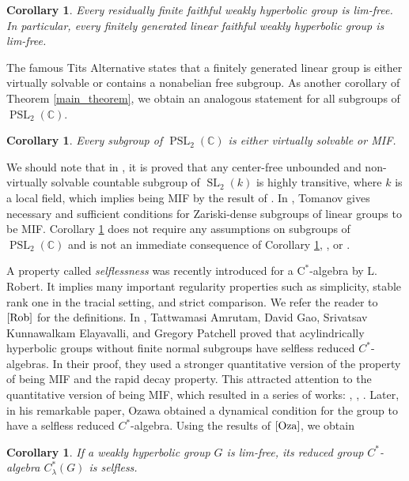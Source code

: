 \documentclass[11pt,letterpaper]{article}
\newcommand{\CC}{\mathbb{C}}
\DeclareMathOperator{\SL}{SL}
\DeclareMathOperator{\PSL}{PSL}
\newtheorem{corA}[thmA]{Corollary}
\theoremstyle{definition}
\theoremstyle{remark}
\begin{document}
\begin{corA}\label{res finite groups}
Every residually finite faithful weakly hyperbolic group is lim-free. In particular, every finitely generated linear faithful weakly hyperbolic group is lim-free.
\end{corA}

The famous Tits Alternative states that a finitely generated linear group is either virtually solvable or contains a nonabelian free subgroup. As another corollary of Theorem \ref{main_theorem}, we obtain an analogous statement for all subgroups of $\PSL_2(\CC)$.

\begin{corA}\label{generalized Tits Alternative}
Every subgroup of $\PSL_2(\CC)$ is either virtually solvable or MIF.
\end{corA}

We should note that in \cite{GGS}, it is proved that any center-free unbounded and non-virtually solvable countable subgroup of $\SL_2(k)$ is highly transitive, where $k$ is a local field, which implies being MIF by the result of \cite{OH}. In \cite{Tom}, Tomanov gives necessary and sufficient conditions for Zariski-dense subgroups of linear groups to be MIF. Corollary \ref{generalized Tits Alternative} does not require any assumptions on subgroups of  $\PSL_2(\CC)$ and is not an immediate consequence of Corollary \ref{res finite groups}, \cite{Tom}, or \cite{GGS}.

A property called {\it selflessness} was recently introduced for a $\mathrm{C}^*$-algebra by L. Robert. It implies many important regularity properties such as simplicity, stable rank one in the tracial setting, and strict comparison. 
We refer the reader to $\cite{Rob}$ for the definitions. In \cite{AGKEP}, Tattwamasi Amrutam, David Gao, Srivatsav Kunnawalkam Elayavalli, and Gregory Patchell proved that acylindrically hyperbolic groups without finite normal subgroups have selfless reduced $C^*$-algebras. In their proof, they used a stronger quantitative version of the property of being MIF and the rapid decay property. This attracted attention to the quantitative version of being MIF, which resulted in a series of works: \cite{BS}, \cite{AG}, \cite{Vid}. Later, in his remarkable paper, Ozawa obtained a dynamical condition for the group to have a selfless reduced $C^*$-algebra. Using the results of $\cite{Oza}$, we obtain 

\begin{corA}\label{selfless groups}
If a weakly hyperbolic group $G$ is lim-free, its reduced group $C^*$-algebra $C_\lambda^*(G)$ is selfless.
\end{corA}
\end{document}
